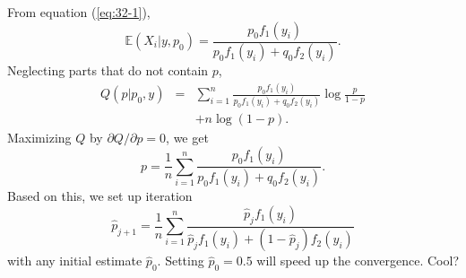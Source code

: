 \documentclass[12pt,twocolumn]{article} %
\newcommand{\bqn}{\begin{eqnarray*}}
\newcommand{\eqn}{\end{eqnarray*}}
\begin{document}
\begin{enumerate}
From equation (\ref{eq:32-1}),
$$\mathbb{E}(X_i|y,p_0) = \frac{p_0f_1(y_i)}{ p_0f_1(y_i) + q_0
f_2(y_i)}.$$ Neglecting parts that do not contain $p$,
 \bqn
Q(p|p_0,y) &=& \sum_{i=1}^n \frac{p_0f_1(y_i)}{ p_0f_1(y_i) + q_0
f_2(y_i)}\log \frac{p}{1-p}\\
&&+ n\log (1-p).\eqn Maximizing $Q$ by $\partial Q/\partial p=0$,
we get $$p= \frac{1}{n} \sum_{i=1}^n \frac{p_0f_1(y_i)}{
p_0f_1(y_i) + q_0 f_2(y_i)}.$$ Based on this, we set up iteration
$$\hat p_{j+1} = \frac{1}{n} \sum_{i=1}^n \frac{\hat p_jf_1(y_i)}{
\hat p_jf_1(y_i) + (1-\hat p_j) f_2(y_i)}$$ with any initial
estimate $\hat p_0$. Setting $\hat p_0=0.5$ will speed up the
convergence. Cool?


\end{enumerate}
\end{document}
